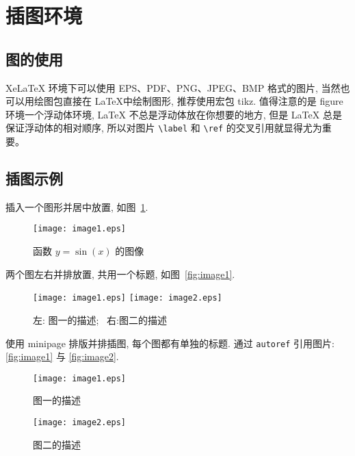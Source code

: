 \documentclass[zihao=-4,twoside,final]{ctexart}
\numberwithin{equation}{section}
\numberwithin{figure}{section}
\numberwithin{table}{section}
\theoremstyle{plain}
\begin{document}

\clearpage
\section{插图环境}

\subsection{图的使用}

XeLaTeX 环境下可以使用 EPS、PDF、PNG、JPEG、BMP 格式的图片, 当然也可以用绘图包直接在 \LaTeX 中绘制图形, 推荐使用宏包 tikz. 值得注意的是 figure 环境一个浮动体环境, LaTeX 不总是浮动体放在你想要的地方, 但是 LaTeX 总是保证浮动体的相对顺序, 所以对图片 \verb|\label| 和 \verb|\ref| 的交叉引用就显得尤为重要。

\subsection{插图示例}

插入一个图形并居中放置, 如图~\ref{fig:sinx}.
\begin{figure}[htp!]
  \centering
  \texttt{[image: image1.eps]}
  \caption{函数 $y=\sin(x)$ 的图像}\label{fig:sinx}
  \vspace{-2ex}
\end{figure}

两个图左右并排放置, 共用一个标题, 如图~\ref{fig:image1}.

\begin{figure}[htp!]
  \centering
  \texttt{[image: image1.eps]}
  \hfill
  \texttt{[image: image2.eps]}
  \caption{左: 图一的描述;~ 右:图二的描述}
  \label{fig:image}
  \vspace{-2ex}
\end{figure}

使用 minipage 排版并排插图, 每个图都有单独的标题. 通过 \verb|autoref| 引用图片: \autoref{fig:image1} 与 \autoref{fig:image2}.
\begin{figure}[htp!]
\begin{minipage}[t]{0.48\linewidth}
  \centering
  \texttt{[image: image1.eps]}
  \caption{图一的描述}
  \label{fig:image1}
\end{minipage}
\hfill
\begin{minipage}[t]{0.48\linewidth}
\centering
   \texttt{[image: image2.eps]}
   \caption{图二的描述}
   \label{fig:image2}
\end{minipage}
\end{figure}
\end{document}
